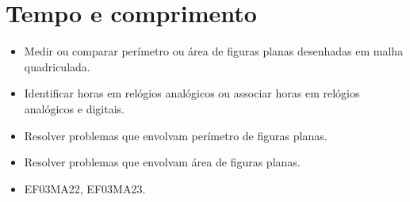 \chapter{Tempo e comprimento}


\begin{itemize}
\item Medir ou comparar perímetro ou área de figuras planas desenhadas em malha quadriculada.

\item Identificar horas em relógios analógicos ou associar horas em relógios analógicos e digitais.

\item Resolver problemas que envolvam perímetro de figuras planas.

\item Resolver problemas que envolvam área de figuras planas.
\end{itemize}


\begin{itemize}
 \item  EF03MA22, EF03MA23.
\end{itemize}

